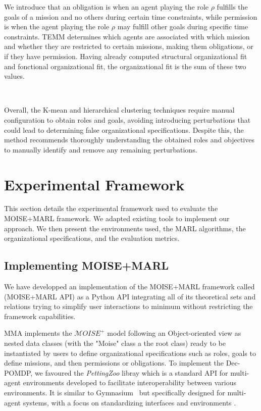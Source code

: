 \documentclass[sigconf,anonymous]{aamas}
\begin{document}
We introduce that an obligation is when an agent playing the role $\rho$ fulfills the goals of a mission and no others during certain time constraints, while permission is when the agent playing the role $\rho$ may fulfill other goals during specific time constraints.
TEMM determines which agents are associated with which mission and whether they are restricted to certain missions, making them obligations, or if they have permission.
Having already computed structural organizational fit and fonctional organizational fit, the organizational fit is the sum of these two values.

\

Overall, the K-mean and hierarchical clustering techniques require manual configuration to obtain roles and goals, avoiding introducing perturbations that could lead to determining false organizational specifications. Despite this, the method recommends thoroughly understanding the obtained roles and objectives to manually identify and remove any remaining perturbations.

\section{Experimental Framework}
\label{sec:experimental_setup}

This section details the experimental framework used to evaluate the MOISE+MARL framework. We adapted existing tools to implement our approach. We then present the environments used, the MARL algorithms, the organizational specifications, and the evaluation metrics.

\subsection{Implementing MOISE+MARL}

We have developped an implementation of the MOISE+MARL framework called  (MOISE+MARL API) as a Python API integrating all of its theoretical sets and relations trying to simplify user interactions to minimum without restricting the framework capabilities.

MMA implements the $\mathcal{M}OISE^+$ model following an Object-oriented view as nested data classes (with the "Moise" class a the root class) ready to be instantiated by users to define organizational specifications such as roles, goals to define missions, and then permissions or obligations.
%
To implement the Dec-POMDP, we favoured the \textit{PettingZoo} libray which is a standard API for multi-agent environments developed to facilitate interoperability between various environments. It is similar to Gymnasium~\cite{kwiatkowski2024} but specifically designed for multi-agent systems, with a focus on standardizing interfaces and environments \cite{terry2020pettingzoo}.
\end{document}
